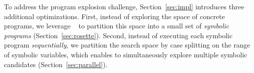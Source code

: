 To address the program explosion challenge, Section~\ref{sec:impl} introduces three additional 
optimizations. First, instead of exploring the space of concrete programs, we
leverage \rosette~\cite{rosette} to partition this space into a small set of 
\emph{symbolic programs} 
(Section~\ref{sec:rosette}). 
Second, instead of executing
each symbolic program \emph{sequentially}, we partition the search space by case
splitting on the range of symbolic variables, which enables \toolname to
simultaneously explore multiple symbolic candidates
(Section~\ref{sec:parallel}).
